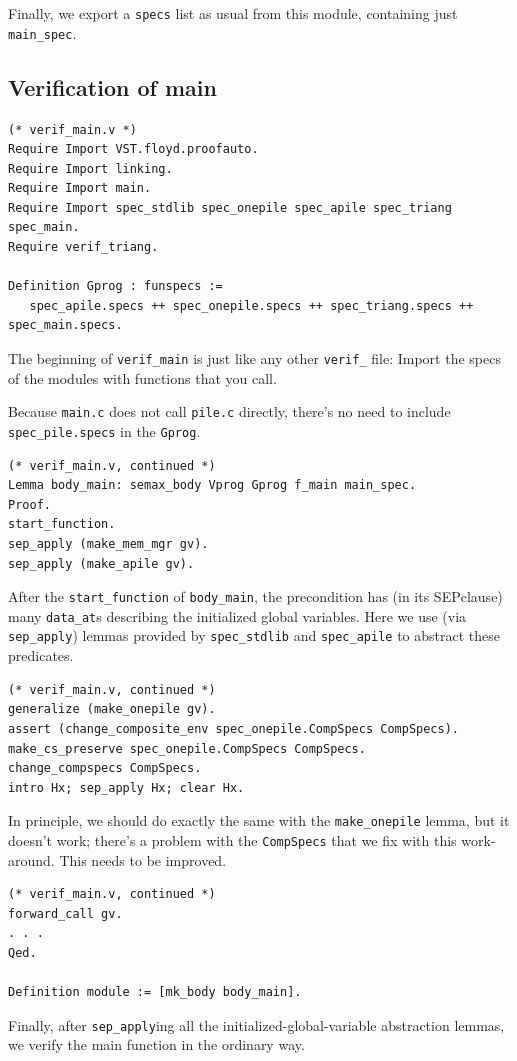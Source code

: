 \documentclass[runningheads,orivec]{llncs}
\newcommand{\SEP}{\mbox{\small SEP}}
\begin{document}
Finally, we export a \lstinline{specs} list as usual from this module,
containing just \lstinline{main_spec}.

\subsection*{Verification of main}
\begin{lstlisting}
(* verif_main.v *)
Require Import VST.floyd.proofauto.
Require Import linking.
Require Import main.
Require Import spec_stdlib spec_onepile spec_apile spec_triang spec_main.
Require verif_triang.

Definition Gprog : funspecs :=   
   spec_apile.specs ++ spec_onepile.specs ++ spec_triang.specs ++ spec_main.specs.
\end{lstlisting}
The beginning of \lstinline{verif_main} is just like
any other \lstinline{verif_} file:  Import the specs of
the modules with functions that you call.

Because \lstinline{main.c} does not call \lstinline{pile.c} directly,
there's no need to include \lstinline{spec_pile.specs} in the
\lstinline{Gprog}.

\begin{lstlisting}
(* verif_main.v, continued *)
Lemma body_main: semax_body Vprog Gprog f_main main_spec.
Proof.
start_function.
sep_apply (make_mem_mgr gv).
sep_apply (make_apile gv).
\end{lstlisting}
After the \lstinline{start_function} of \lstinline{body_main},
the precondition has (in its \SEP clause) many
\lstinline{data_at}s describing the initialized global variables.
Here we use (via \lstinline{sep_apply}) lemmas provided by
\lstinline{spec_stdlib} and \lstinline{spec_apile} to abstract
these predicates.

\begin{lstlisting}
(* verif_main.v, continued *)
generalize (make_onepile gv).
assert (change_composite_env spec_onepile.CompSpecs CompSpecs).
make_cs_preserve spec_onepile.CompSpecs CompSpecs.
change_compspecs CompSpecs.
intro Hx; sep_apply Hx; clear Hx.
\end{lstlisting}
In principle, we should do exactly the same with
the \lstinline{make_onepile} lemma, but it doesn't work;
there's a problem with the \lstinline{CompSpecs} that we fix
with this work-around.  This needs to be improved.

\begin{lstlisting}
(* verif_main.v, continued *)
forward_call gv.
. . .
Qed.

Definition module := [mk_body body_main].
\end{lstlisting}
Finally, after \lstinline{sep_apply}ing all the initialized-global-variable
abstraction lemmas, we verify the main function in the ordinary way.
\end{document}
